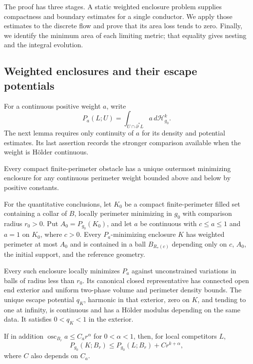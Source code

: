 The proof has three stages. A static weighted enclosure problem supplies
compactness and boundary estimates for a single conductor. We apply
those estimates to the discrete flow and prove that its area loss tends
to zero. Finally, we identify the minimum area of each limiting metric;
that equality gives nesting and the integral evolution.

\subsection{Weighted enclosures and their escape potentials}

For a continuous positive weight $a$, write
\[
 P_a(L;U)=\int_{U\cap\partial^*L}a\,d\mathcal H^k_{g_0}.
\]
The next lemma requires only continuity of $a$ for its density and
potential estimates. Its last assertion records the stronger comparison
available when the weight is H\"older continuous.

\begin{lemma}
\label{lem:rpi:static-hull-potential}
Every compact finite-perimeter obstacle has a unique outermost
minimizing enclosure for any continuous perimeter weight bounded above
and below by positive constants.

For the quantitative conclusions, let $K_0$ be a compact
finite-perimeter filled set containing a collar of $B$, locally
perimeter minimizing in $g_0$ with comparison radius $r_0>0$. Put
$A_0=P_{g_0}(K_0)$, and let $a$ be continuous with
$c\le a\le1$ and $a=1$ on $K_0$, where $c>0$.
Every $P_a$-minimizing enclosure $K$ has weighted perimeter at most $A_0$
and is contained in a ball $B_{R_*(c)}$ depending only on $c$, $A_0$,
the initial support, and the reference geometry.

Every such enclosure locally minimizes $P_a$ against unconstrained
variations in balls of radius less than $r_0$. Its canonical closed
representative has connected open end exterior and uniform two-phase
volume and perimeter density bounds. The unique escape potential
$q_K$, harmonic in that exterior, zero on $K$, and tending to one at
infinity, is continuous and has a H\"older modulus depending on the
same data. It satisfies $0<q_K<1$ in the exterior.

If in addition $\operatorname{osc}_{B_r}a\le C_a r^\alpha$ for
$0<\alpha<1$, then, for local competitors $L$,
\[
 P_{g_0}(K;B_r)\le P_{g_0}(L;B_r)+C r^{k+\alpha},
\]
where $C$ also depends on $C_a$.
\end{lemma}

